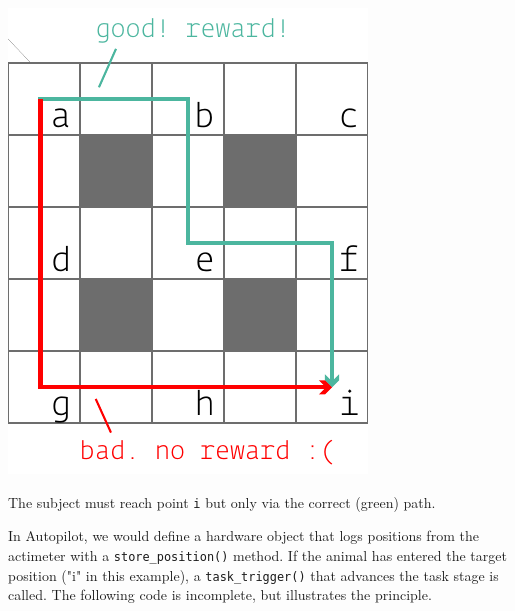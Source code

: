 \begin{marginfigure}[0.65cm]
\includegraphics[]{figures/side_18_maze.pdf}
\caption{The subject must reach point \texttt{i} but only via the correct (green) path.}
\label{fig:maze}
\end{marginfigure}

In Autopilot, we would define a hardware object that logs positions from the actimeter with a \texttt{store_position()} method. If the animal has entered the target position ("i" in this example), a \texttt{task_trigger()} that advances the task stage is called. The following code is incomplete, but illustrates the principle.

